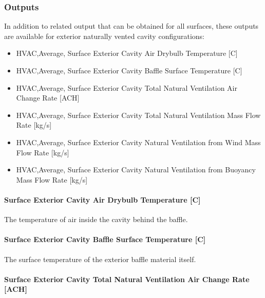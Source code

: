 \subsubsection{Outputs}\label{outputs-2}

In addition to related output that can be obtained for all surfaces, these outputs are available for exterior naturally vented cavity configurations:

\begin{itemize}
\item
  HVAC,Average, Surface Exterior Cavity Air Drybulb Temperature {[}C{]}
\item
  HVAC,Average, Surface Exterior Cavity Baffle Surface Temperature {[}C{]}
\item
  HVAC,Average, Surface Exterior Cavity Total Natural Ventilation Air Change Rate {[}ACH{]}
\item
  HVAC,Average, Surface Exterior Cavity Total Natural Ventilation Mass Flow Rate {[}kg/s{]}
\item
  HVAC,Average, Surface Exterior Cavity Natural Ventilation from Wind Mass Flow Rate {[}kg/s{]}
\item
  HVAC,Average, Surface Exterior Cavity Natural Ventilation from Buoyancy Mass Flow Rate {[}kg/s{]}
\end{itemize}

\paragraph{Surface Exterior Cavity Air Drybulb Temperature {[}C{]}}\label{surface-exterior-cavity-air-drybulb-temperature-c}

The temperature of air inside the cavity behind the baffle.

\paragraph{Surface Exterior Cavity Baffle Surface Temperature {[}C{]}}\label{surface-exterior-cavity-baffle-surface-temperature-c}

The surface temperature of the exterior baffle material itself.

\paragraph{Surface Exterior Cavity Total Natural Ventilation Air Change Rate {[}ACH{]}}\label{surface-exterior-cavity-total-natural-ventilation-air-change-rate-ach}

